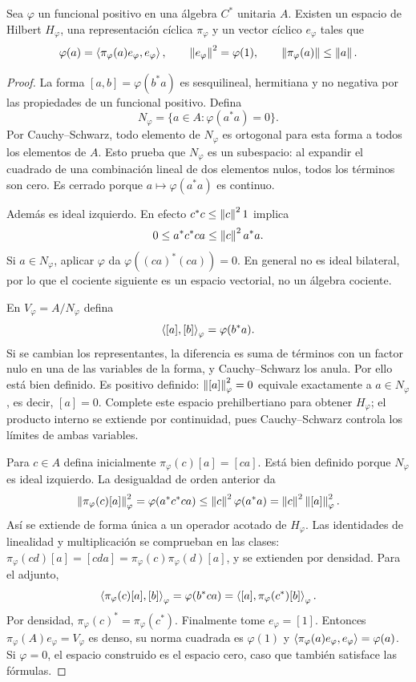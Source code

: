 \begin{teorema}\label{v3:gns}
Sea $\varphi$ un funcional positivo en una álgebra $C^*$ unitaria $A$. Existen un espacio de Hilbert $H_\varphi$, una representación cíclica $\pi_\varphi$ y un vector cíclico $e_\varphi$ tales que
\[
 \varphi(a)=\left\langle\pi_\varphi(a)e_\varphi,e_\varphi\right\rangle,
 \qquad \left\lVert e_\varphi\right\rVert^2=\varphi(1),\qquad
 \left\lVert\pi_\varphi(a)\right\rVert\le\left\lVert a\right\rVert.
\]
\end{teorema}
\begin{proof}
La forma $[a,b]=\varphi(b^*a)$ es sesquilineal, hermitiana y no negativa por las propiedades de un funcional positivo. Defina
\[
 N_\varphi=\{a\in A:\varphi(a^*a)=0\}.
\]
Por Cauchy--Schwarz, todo elemento de $N_\varphi$ es ortogonal para esta forma a todos los elementos de $A$. Esto prueba que $N_\varphi$ es un subespacio: al expandir el cuadrado de una combinación lineal de dos elementos nulos, todos los términos son cero. Es cerrado porque $a\mapsto\varphi(a^*a)$ es continuo.

Además es ideal izquierdo. En efecto $c^*c\le\left\lVert c\right\rVert^21$ implica
\[
 0\le a^*c^*ca\le\left\lVert c\right\rVert^2a^*a.
\]
Si $a\in N_\varphi$, aplicar $\varphi$ da $\varphi((ca)^*(ca))=0$. En general no es ideal bilateral, por lo que el cociente siguiente es un espacio vectorial, no un álgebra cociente.

En $V_\varphi=A/N_\varphi$ defina
\[
 \left\langle[a],[b]\right\rangle_\varphi=\varphi(b^*a).
\]
Si se cambian los representantes, la diferencia es suma de términos con un factor nulo en una de las variables de la forma, y Cauchy--Schwarz los anula. Por ello está bien definido. Es positivo definido: $\left\lVert[a]\right\rVert_\varphi^2=0$ equivale exactamente a $a\in N_\varphi$, es decir, $[a]=0$. Complete este espacio prehilbertiano para obtener $H_\varphi$; el producto interno se extiende por continuidad, pues Cauchy--Schwarz controla los límites de ambas variables.

Para $c\in A$ defina inicialmente $\pi_\varphi(c)[a]=[ca]$. Está bien definido porque $N_\varphi$ es ideal izquierdo. La desigualdad de orden anterior da
\[
 \left\lVert\pi_\varphi(c)[a]\right\rVert_\varphi^2
 =\varphi(a^*c^*ca)\le\left\lVert c\right\rVert^2\varphi(a^*a)
 =\left\lVert c\right\rVert^2\left\lVert[a]\right\rVert_\varphi^2.
\]
Así se extiende de forma única a un operador acotado de $H_\varphi$. Las identidades de linealidad y multiplicación se comprueban en las clases: $\pi_\varphi(cd)[a]=[cda]=\pi_\varphi(c)\pi_\varphi(d)[a]$, y se extienden por densidad. Para el adjunto,
\[
 \left\langle\pi_\varphi(c)[a],[b]\right\rangle_\varphi
 =\varphi(b^*ca)
 =\left\langle[a],\pi_\varphi(c^*)[b]\right\rangle_\varphi.
\]
Por densidad, $\pi_\varphi(c)^*=\pi_\varphi(c^*)$. Finalmente tome $e_\varphi=[1]$. Entonces $\pi_\varphi(A)e_\varphi=V_\varphi$ es denso, su norma cuadrada es $\varphi(1)$ y $\left\langle\pi_\varphi(a)e_\varphi,e_\varphi\right\rangle=\varphi(a)$. Si $\varphi=0$, el espacio construido es el espacio cero, caso que también satisface las fórmulas.
\end{proof}

